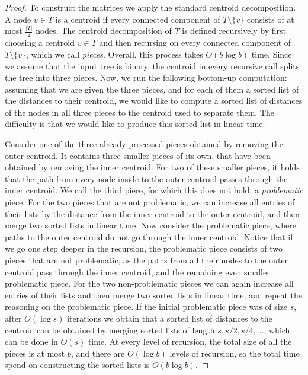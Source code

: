 \documentclass[a4paper,UKenglish]{lipics-v2016}
\theoremstyle{plain}
\begin{document}
\begin{proof}
To construct the matrices we apply the standard centroid decomposition. A node $v\in T$ is a centroid if every connected component of
$T\setminus\{v\}$ consists of at most $\frac{|T|}{2}$ nodes. The centroid decomposition of $T$ is defined recursively by first choosing a centroid
$v\in T$ and then recursing on every connected component of $T\setminus\{v\}$, which we call \emph{pieces}.
Overall, this process takes $O(b\log b)$ time. Since we assume that the input tree is binary, the centroid in every recursive call splits the tree
into three pieces. Now, we run the following bottom-up computation: assuming that we are given the three pieces, and for each of
them a sorted list of the distances to their centroid, we would like to compute a sorted list of distances of the nodes in all three pieces
to the centroid used to separate them. The difficulty is that we would like to produce this sorted list in linear time.

Consider one of the three already processed pieces obtained by removing the outer centroid. It contains three smaller pieces of its own,
that have been obtained by removing the inner centroid.
For two of these smaller pieces, it holds that the path from every node inside to the outer centroid passes through the inner centroid.
We call the third piece, for which this does not hold, a \textit{problematic} piece. For the two pieces that are not problematic, we can 
increase all entries of their lists by the distance from the inner centroid to the outer centroid, and then merge two sorted lists in linear time.
Now consider the problematic piece, where paths to the outer centroid do not go through the inner centroid. Notice that if we go one step deeper
in the recursion, the problematic piece consists of two pieces that are not problematic, as the paths from all their nodes to the outer centroid
pass through the inner centroid, and the remaining even smaller problematic piece. For the two non-problematic pieces we can again
increase all entries of their lists and then merge two sorted lists in linear time, and repeat the reasoning on the problematic piece.
If the initial problematic piece was of size $s$, after $O(\log s)$ iterations we obtain that a sorted list of distances to the centroid can be
obtained by merging sorted lists of length $s,s/2,s/4,\ldots$, which can be done in $O(s)$ time. At every level of recursion, 
the total size of all the pieces is at most $b$, and there are $O(\log b)$ levels of recursion, so the total time spend on constructing
the sorted lists is $O(b\log b)$.


\end{proof}
\end{document}

